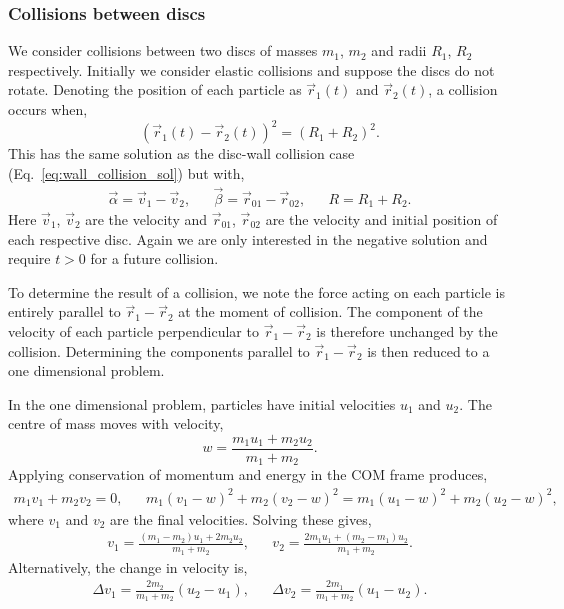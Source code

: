 \documentclass{article}
\begin{document}
\subsubsection{Collisions between discs}
We consider collisions between two discs of masses $m_1$, $m_2$ and radii $R_1$, $R_2$ respectively. Initially we consider elastic collisions and suppose the discs do not rotate. Denoting the position of each particle as $\vec{r}_1(t)$ and $\vec{r}_2(t)$, a collision occurs when,
\begin{equation}
    (\vec{r}_1(t) - \vec{r}_2(t))^2 = (R_1 + R_2)^2.
\end{equation}
This has the same solution as the disc-wall collision case (Eq.~\ref{eq:wall_collision_sol}) but with,
\begin{align}
    \vec{\alpha}
    =
    \vec{v}_1 - \vec{v}_2,
    &&
    \vec{\beta}
    =
    \vec{r}_{01} - \vec{r}_{02},
    &&
    R = R_1 + R_2.
\end{align}
Here $\vec{v}_1$, $\vec{v}_2$ are the velocity and $\vec{r}_{01}$, $\vec{r}_{02}$ are the velocity and initial position of each respective disc. Again we are only interested in the negative solution and require $t>0$ for a future collision.

To determine the result of a collision, we note the force acting on each particle is entirely parallel to $\vec{r}_1 - \vec{r}_2$ at the moment of collision. The component of the velocity of each particle perpendicular to $\vec{r}_1 - \vec{r}_2$ is therefore unchanged by the collision. Determining the components parallel to $\vec{r}_1 - \vec{r}_2$ is then reduced to a one dimensional problem.

In the one dimensional problem, particles have initial velocities $u_1$ and $u_2$. The centre of mass moves with velocity,
\begin{equation}
    w
    =
    \frac{m_1 u_1 + m_2 u_2}{m_1 + m_2}.
\end{equation}
Applying conservation of momentum and energy in the COM frame produces,
\begin{align}
    m_1 v_1 + m_2 v_2 = 0,
    &&
    m_1 (v_1 - w)^2 + m_2 (v_2 - w)^2 = m_1 (u_1 - w)^2 + m_2 (u_2 - w)^2,
\end{align}
where $v_1$ and $v_2$ are the final velocities. Solving these gives,
\begin{align}
    v_1
    =
    \frac{(m_1 - m_2) u_1 + 2m_2 u_2}{m_1 + m_2},
    &&
    v_2
    =
    \frac{2m_1 u_1 + (m_2 - m_1) u_2}{m_1 + m_2}.
\end{align}
Alternatively, the change in velocity is,
\begin{align}
    \Delta v_1
    =
    \frac{2m_2}{m_1 + m_2} (u_2 - u_1),
    &&
    \Delta v_2
    =
    \frac{2m_1}{m_1 + m_2} (u_1 - u_2).
\end{align}
\end{document}
